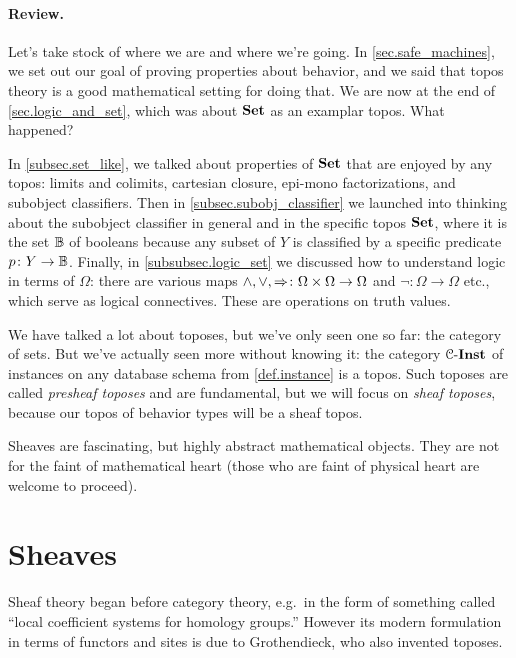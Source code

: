 \documentclass[7Sketches]{subfiles}
\begin{document}
\paragraph{Review.}
Let's take stock of where we are and where we're going. In \cref{sec.safe_machines}, we set out our goal of proving properties about behavior, and we said that topos theory is a good mathematical setting for doing that. We are now at the end of \cref{sec.logic_and_set}, which was about $\mathbf{Set}$ as an examplar topos. What happened?

In \cref{subsec.set_like}, we talked about properties of $\mathbf{Set}$ that are enjoyed by any topos: limits and colimits, cartesian closure, epi-mono factorizations, and subobject classifiers. Then in \cref{subsec.subobj_classifier} we launched into thinking about the subobject classifier in general and in the specific topos $\mathbf{Set}$, where it is the set $\mathbb{B}$ of booleans because any subset of $Y$ is classified by a specific predicate $p\colon Y\to\mathbb{B}$. Finally, in \cref{subsubsec.logic_set} we discussed how to understand logic in terms of $\Omega$: there are various maps $\wedge,\vee,\Rightarrow\colon\Omega\times\Omega\to\Omega$ and $\neg\colon\Omega\to\Omega$ etc., which serve as logical connectives. These are operations on truth values.%
%

We have talked a lot about toposes, but we've only seen one so far: the category of sets. But we've actually seen more without knowing it: the category $\mathcal{C}\textnormal{-}\mathbf{Inst}$ of instances on any database schema from \cref{def.instance} is a topos. Such toposes are called \emph{presheaf toposes} and are fundamental, but we will focus on \emph{sheaf toposes}, because our topos of behavior types will be a sheaf topos.%

Sheaves are fascinating, but highly abstract mathematical objects. They are not for the faint of mathematical heart (those who are faint of physical heart are welcome to proceed). 

%

\section{Sheaves}%
\label{sec.sheaves}%


Sheaf theory began before category theory, e.g.\ in the form of something called
``local coefficient systems for homology groups.'' However its modern
formulation in terms of functors and sites is due to Grothendieck, who also
invented toposes.
\end{document}
